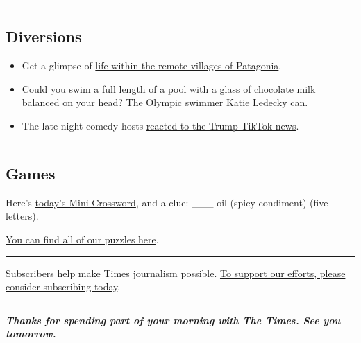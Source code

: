 \begin{center}\rule{0.5\linewidth}{\linethickness}\end{center}

\hypertarget{diversions}{%
\subsection{Diversions}\label{diversions}}

\begin{itemize}
\item
  Get a glimpse of
  \href{https://www.nytimes.com/2020/08/03/travel/remote-schools-patagonia.html}{life
  within the remote villages of Patagonia}.
\item
  Could you swim
  \href{https://twitter.com/Peter_Baugh/status/1290335655051104257}{a
  full length of a pool with a glass of chocolate milk balanced on your
  head}? The Olympic swimmer Katie Ledecky can.
\item
  The late-night comedy hosts
  \href{https://www.nytimes.com/2020/08/04/arts/television/seth-meyers-tiktok-trump.html}{reacted
  to the Trump-TikTok news}.
\end{itemize}

\begin{center}\rule{0.5\linewidth}{\linethickness}\end{center}

\hypertarget{games}{%
\subsection{Games}\label{games}}

Here's \href{https://www.nytimes.com/crosswords/game/mini}{today's Mini
Crossword}, and a clue: \_\_\_ oil (spicy condiment) (five letters).

\href{https://www.nytimes.com/crosswords}{You can find all of our
puzzles here}.

\begin{center}\rule{0.5\linewidth}{\linethickness}\end{center}

Subscribers help make Times journalism possible.
\href{https://www.nytimes.com/subscription?campaignId=98XRW}{To support
our efforts, please consider subscribing today}.

\begin{center}\rule{0.5\linewidth}{\linethickness}\end{center}

\emph{\textbf{Thanks for spending part of your morning with The Times.
See you tomorrow.}}

